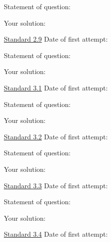 \documentclass[12pt]{article}
\begin{document}
\bigskip

Statement of question:

\vspace{1in}

Your solution:

\newpage


\underline{Standard 2.9} \hspace{6cm} Date of first attempt:



\bigskip

Statement of question:

\vspace{1in}

Your solution:

\newpage


\underline{Standard 3.1} \hspace{6cm} Date of first attempt:



\bigskip

Statement of question:

\vspace{1in}

Your solution:

\newpage


\underline{Standard 3.2} \hspace{6cm} Date of first attempt:



\bigskip

Statement of question:

\vspace{1in}

Your solution:

\newpage


\underline{Standard 3.3} \hspace{6cm} Date of first attempt:



\bigskip

Statement of question:

\vspace{1in}

Your solution:

\newpage


\underline{Standard 3.4} \hspace{6cm} Date of first attempt:
\end{document}

